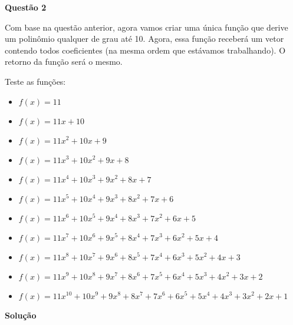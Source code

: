 \documentclass[12pt, a4paper]{article}
\begin{document}



\textbf{Questão 2}

Com base na questão anterior, agora vamos criar uma única função que derive um polinômio qualquer de grau até 10. Agora, essa função receberá um vetor contendo todos coeficientes (na mesma ordem que estávamos trabalhando). O retorno da função será o mesmo.

Teste as funções:

\begin{itemize}
	\item $f(x) = 11$
	\item $f(x) = 11x + 10$
	\item $f(x) = 11x^2 + 10x + 9$
	\item $f(x) = 11x^3 + 10x^2 + 9x + 8$
	\item $f(x) = 11x^4 + 10x^3 + 9x^2 + 8x + 7$
	\item $f(x) = 11x^5 + 10x^4 + 9x^3 + 8x^2 + 7x + 6$
	\item $f(x) = 11x^6 + 10x^5 + 9x^4 + 8x^3 + 7x^2 + 6x + 5$
	\item $f(x) = 11x^7 + 10x^6 + 9x^5 + 8x^4 + 7x^3 + 6x^2 + 5x + 4$
	\item $f(x) = 11x^8 + 10x^7 + 9x^6 + 8x^5 + 7x^4 + 6x^3 + 5x^2 + 4x + 3$
	\item $f(x) = 11x^9 + 10x^8 + 9x^7 + 8x^6 + 7x^5 + 6x^4 + 5x^3 + 4x^2 + 3x + 2$
	\item $f(x) = 11x^{10} + 10x^9 + 9x^8 + 8x^7 + 7x^6 + 6x^5 + 5x^4 + 4x^3 + 3x^2 + 2x + 1$
\end{itemize}

\textbf{Solução}
\end{document}

